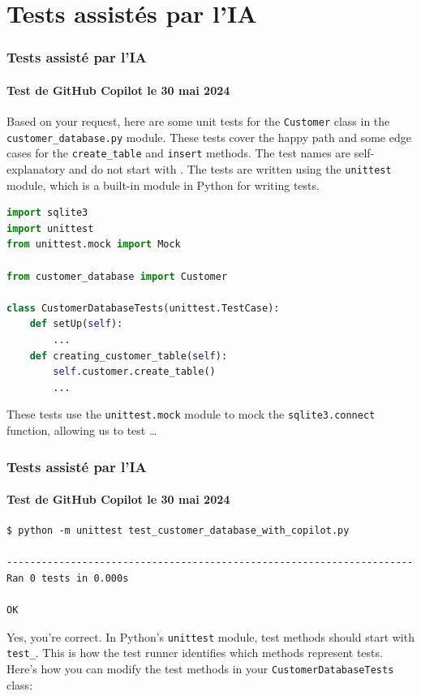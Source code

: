 \documentclass{beamer}
\begin{document}
    \section{Tests assistés par l'IA}\label{sec:tests-assistes-par-ia}

    \begin{frame}[fragile]
        \transdissolve
        \frametitle{Tests assisté par l'IA}
        \framesubtitle{Test de GitHub Copilot le 30 mai 2024}
        Based on your request, here are some unit tests for the \lstinline{Customer} class in the \lstinline{customer_database.py} module.
        These tests cover the happy path and some edge cases for the \lstinline{create_table} and \lstinline{insert} methods.
        The test names are self-explanatory and do not start with .
        The tests are written using the \lstinline{unittest} module, which is a built-in module in Python for writing tests.
        \begin{lstlisting}[language=Python]
import sqlite3
import unittest
from unittest.mock import Mock

from customer_database import Customer

class CustomerDatabaseTests(unittest.TestCase):
    def setUp(self):
        ...
    def creating_customer_table(self):
        self.customer.create_table()
        ...
        \end{lstlisting}
        These tests use the \lstinline{unittest.mock} module to mock the \lstinline{sqlite3.connect} function, allowing us to test \ldots
    \end{frame}

    \begin{frame}[fragile]
        \transdissolve
        \frametitle{Tests assisté par l'IA}
        \framesubtitle{Test de GitHub Copilot le 30 mai 2024}
        \begin{lstlisting}
$ python -m unittest test_customer_database_with_copilot.py

----------------------------------------------------------------------
Ran 0 tests in 0.000s

OK
        \end{lstlisting}
        \bigbreak
        Yes, you're correct.
        In Python's \lstinline{unittest} module, test methods should start with \lstinline{test_}.
        This is how the test runner identifies which methods represent tests.
        Here's how you can modify the test methods in your \lstinline{CustomerDatabaseTests} class:
    \end{frame}
\end{document}
